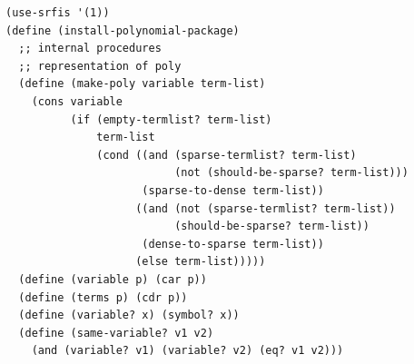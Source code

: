 \documentclass[final,fleqn,titlepage,twoside]{article}
\begin{document}
\begin{verbatim}
(use-srfis '(1))
(define (install-polynomial-package)
  ;; internal procedures
  ;; representation of poly
  (define (make-poly variable term-list)
    (cons variable
          (if (empty-termlist? term-list)
              term-list
              (cond ((and (sparse-termlist? term-list)
                          (not (should-be-sparse? term-list)))
                     (sparse-to-dense term-list))
                    ((and (not (sparse-termlist? term-list))
                          (should-be-sparse? term-list))
                     (dense-to-sparse term-list))
                    (else term-list)))))
  (define (variable p) (car p))
  (define (terms p) (cdr p))
  (define (variable? x) (symbol? x))
  (define (same-variable? v1 v2)
    (and (variable? v1) (variable? v2) (eq? v1 v2)))
  

\end{verbatim}
\end{document}
